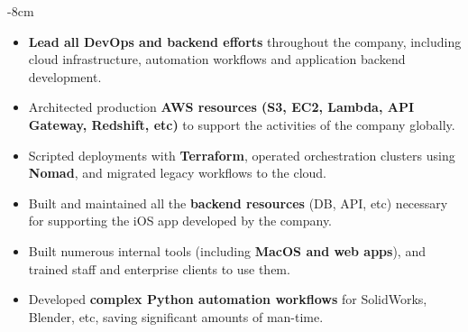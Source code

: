 \documentclass[10pt,a4paper]{altacv}
\begin{document}


\begin{adjustwidth}{}{-8cm}
\makecvheader
\end{adjustwidth}


\begin{itemize}
	\item \textbf{Lead all DevOps and backend efforts} throughout the company, including cloud infrastructure, automation workflows and application backend development.
	\item Architected production \textbf{AWS resources (S3, EC2, Lambda, API Gateway, Redshift, etc)} to support the activities of the company globally.
	\item Scripted deployments with \textbf{Terraform}, operated orchestration clusters using \textbf{Nomad}, and migrated legacy workflows to the cloud.
	\item Built and maintained all the \textbf{backend resources} (DB, API, etc) necessary for supporting the iOS app developed by the company.
	\item Built numerous internal tools (including \textbf{MacOS and web apps}), and trained staff and enterprise clients to use them.
	\item Developed \textbf{complex Python automation workflows} for SolidWorks, Blender, etc, saving significant amounts of man-time.
\end{itemize}

\divider
\end{document}
